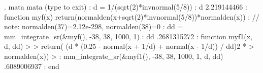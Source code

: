 . mata
 mata (type {} to exit) 
: d = 1/(sqrt(2)*invnormal(5/8))
{\smallskip}
: d 
  2.219144466
{\smallskip}
: function myf(x) return(normalden(x+sqrt(2)*invnormal(5/8))*normalden(x))
{\smallskip}
: // note: normalden(37)=2.12e-298, normalden(38)=0
: dd = mm_integrate_sr(\&myf(), -38, 38, 1000, 1) 
{\smallskip}
: dd
  .2681315272
{\smallskip}
: function myf1(x, d, dd)
> {\lbr}
>     return( (d * (0.25 - normal(x + 1/d) + normal(x - 1/d)) / dd){\caret}2 * 
>              normalden(x))
> {\rbr}
{\smallskip}
: mm_integrate_sr(\&myf1(), -38, 38, 1000, 1, d, dd)
  .6089006937
{\smallskip}
: end
{\smallskip}
